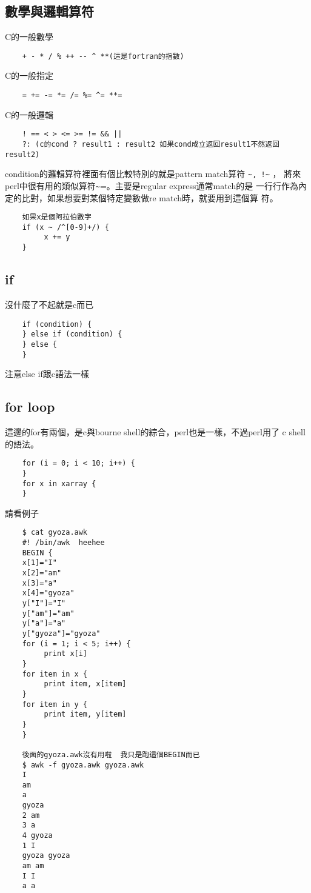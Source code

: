     \subsection{數學與邏輯算符}
    C的一般數學
    \begin{verbatim}
    + - * / % ++ -- ^ **(這是fortran的指數)
    \end{verbatim}
    C的一般指定
    \begin{verbatim}
    = += -= *= /= %= ^= **=
    \end{verbatim}
    C的一般邏輯
    \begin{verbatim}
    ! == < > <= >= != && ||
    ?: (c的cond ? result1 : result2 如果cond成立返回result1不然返回result2)
    \end{verbatim}
    condition的邏輯算符裡面有個比較特別的就是pattern match算符 \verb=~, !~= ，
    將來perl中很有用的類似算符\verb=~==。主要是regular express通常match的是
    一行行作為內定的比對，如果想要對某個特定變數做re match時，就要用到這個算
    符。
    \begin{verbatim}
    如果x是個阿拉伯數字
    if (x ~ /^[0-9]+/) {
         x += y
    }

    \end{verbatim}

    \subsection{if}
    沒什麼了不起就是c而已
    \begin{verbatim}
    if (condition) {
    } else if (condition) {
    } else {
    }

    \end{verbatim}
    注意else if跟c語法一樣

    \subsection{for loop}
    這邊的for有兩個，是c與bourne shell的綜合，perl也是一樣，不過perl用了
    c shell的語法。
    \begin{verbatim}
    for (i = 0; i < 10; i++) {
    }
    for x in xarray {
    }
    \end{verbatim}
    請看例子
    \begin{verbatim}
    $ cat gyoza.awk
    #! /bin/awk  heehee
    BEGIN {
    x[1]="I"
    x[2]="am"
    x[3]="a"
    x[4]="gyoza"
    y["I"]="I"
    y["am"]="am"
    y["a"]="a"
    y["gyoza"]="gyoza"
    for (i = 1; i < 5; i++) {
         print x[i]
    }
    for item in x {
         print item, x[item]
    }
    for item in y {
         print item, y[item]
    }
    }

    後面的gyoza.awk沒有用啦  我只是跑這個BEGIN而已
    $ awk -f gyoza.awk gyoza.awk
    I
    am
    a
    gyoza
    2 am
    3 a
    4 gyoza
    1 I
    gyoza gyoza
    am am
    I I
    a a
    \end{verbatim}

